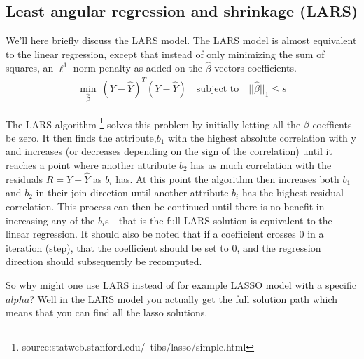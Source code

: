 \subsection{Least angular regression and shrinkage (LARS)}
We'll here briefly discuss the LARS model.
The LARS model is almost equivalent to the linear regression, except that instead of only minimizing the sum of squares, an $\ell^1$ norm penalty as added on the $\hat{\beta}$-vectors coefficients.
\begin{align}
\min_{\hat{\beta}}\ (Y - \hat{Y})^T (Y - \hat{Y}) \quad \text{subject to} \quad ||\hat{\beta}||_1 \le s
\end{align}

The LARS algorithm \footnote{source:statweb.stanford.edu/~tibs/lasso/simple.html} solves this problem by initially letting all the $\beta$ coeffients be zero.
It then finds the attribute,$b_1$ with the highest absolute correlation with y and increases (or decreases depending on the sign of the correlation)
until it reaches a point where another attribute $b_2$ has as much  correlation with the residuals $R=Y-\hat{Y}$ as  $b_i$ has.
At this point the algorithm then increases both $b_1$ and $b_2$ in their join direction until another attribute $b_i$ has the highest residual correlation.
This process can then be continued until there is no benefit in increasing any of the $b_i$s - that is the full LARS solution is equivalent to the linear regression.
It should also be noted that if a coefficient crosses 0 in a iteration (step),
that the coefficient should be set to 0, and the regression direction should subsequently be recomputed.

So why might one use LARS instead of for example LASSO model with a specific $alpha$?
Well in the LARS model you actually get the full solution path which means that you can find all the lasso solutions.
